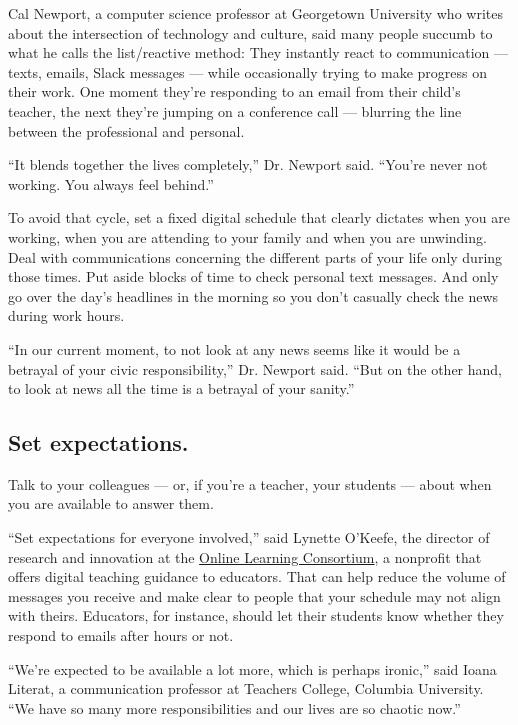 Cal Newport, a computer science professor at Georgetown University who
writes about the intersection of technology and culture, said many
people succumb to what he calls the list/reactive method: They instantly
react to communication --- texts, emails, Slack messages --- while
occasionally trying to make progress on their work. One moment they're
responding to an email from their child's teacher, the next they're
jumping on a conference call --- blurring the line between the
professional and personal.

``It blends together the lives completely,'' Dr. Newport said. ``You're
never not working. You always feel behind.''

To avoid that cycle, set a fixed digital schedule that clearly dictates
when you are working, when you are attending to your family and when you
are unwinding. Deal with communications concerning the different parts
of your life only during those times. Put aside blocks of time to check
personal text messages. And only go over the day's headlines in the
morning so you don't casually check the news during work hours.

``In our current moment, to not look at any news seems like it would be
a betrayal of your civic responsibility,'' Dr. Newport said. ``But on
the other hand, to look at news all the time is a betrayal of your
sanity.''

\hypertarget{set-expectations}{%
\subsection{Set expectations.}\label{set-expectations}}

Talk to your colleagues --- or, if you're a teacher, your students ---
about when you are available to answer them.

``Set expectations for everyone involved,'' said Lynette O'Keefe, the
director of research and innovation at the
\href{https://onlinelearningconsortium.org/}{Online Learning
Consortium}, a nonprofit that offers digital teaching guidance to
educators. That can help reduce the volume of messages you receive and
make clear to people that your schedule may not align with theirs.
Educators, for instance, should let their students know whether they
respond to emails after hours or not.

``We're expected to be available a lot more, which is perhaps ironic,''
said Ioana Literat, a communication professor at Teachers College,
Columbia University. ``We have so many more responsibilities and our
lives are so chaotic now.''

